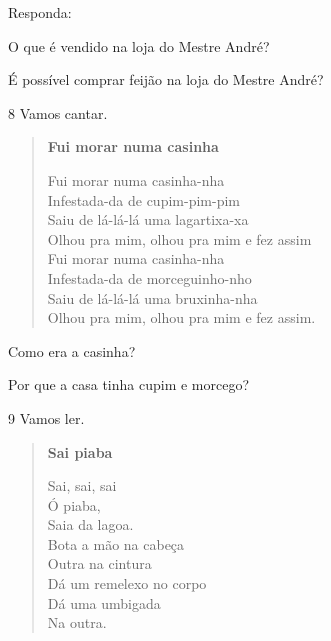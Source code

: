 
Responda:

\begin{escolha}
\item O que é vendido na loja do Mestre André?


\item É possível comprar feijão na loja do Mestre André?

\end{escolha}

\num{8} Vamos cantar.

\begin{verse}
\textbf{Fui morar numa casinha}

Fui morar numa casinha-nha\\
Infestada-da de cupim-pim-pim\\
Saiu de lá-lá-lá uma lagartixa-xa\\
Olhou pra mim, olhou pra mim e fez assim\\
Fui morar numa casinha-nha\\
Infestada-da de morceguinho-nho\\
Saiu de lá-lá-lá uma bruxinha-nha\\
Olhou pra mim, olhou pra mim e fez assim.
\end{verse}


\begin{escolha}
\item Como era a casinha?


\item Por que a casa tinha cupim e morcego?

\end{escolha}

\num{9} Vamos ler.

\begin{verse}
\textbf{Sai piaba}

Sai, sai, sai\\
Ó piaba,\\
Saia da lagoa.\\
Bota a mão na cabeça\\
Outra na cintura\\
Dá um remelexo no corpo\\
Dá uma umbigada\\
Na outra.
\end{verse}

